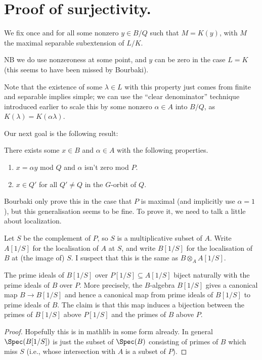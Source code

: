 \section{Proof of surjectivity.}

\begin{definition} We fix once and for all some nonzero $y\in B/Q$ such that $M=K(y)$,
  with $M$ the maximal separable subextension of $L/K$.
  \leanok
\end{definition}

NB we do use nonzeroness at some point, and $y$ can be zero in the case $L=K$
(this seems to have been missed by Bourbaki).

Note that the existence of some $\lambda\in L$ with this property just comes from finite
and separable implies simple; we can use the ``clear denominator'' technique introduced
earlier to scale this by some nonzero $\alpha\in A$ into $B/Q$, as
$K(\lambda)=K(\alpha\lambda)$.

Our next goal is the following result:
\begin{theorem}
  \leanok
  There exists some $x\in B$ and $\alpha\in A$ with the following
  properties.
  \begin{enumerate}
  \item $x=\alpha y$ mod $Q$ and $\alpha$ isn't zero mod $P$.
  \item $x\in Q'$ for all $Q'\not=Q$ in the $G$-orbit of $Q$.
  \end{enumerate}
\end{theorem}

Bourbaki only prove this in the case that $P$ is maximal (and implicitly use $\alpha=1$),
but this generalisation seems to be fine. To prove it, we need to talk a little about localization.

Let $S$ be the complement of $P$, so $S$ is a multiplicative subset of $A$.
Write $A[1/S]$ for the localisation of $A$ at $S$, and write $B[1/S]$
for the localisation of $B$ at (the image of) $S$. I suspect that this is the
same as $B\otimes_AA[1/S]$.

\begin{lemma}
  \leanok
  The prime ideals of $B[1/S]$ over $P[1/S] \subseteq A[1/S]$ biject naturally with
  the prime ideals of $B$ over $P$. More precisely, the $B$-algebra $B[1/S]$
  gives a canonical map $B\to B[1/S]$ and hence a canonical map from prime ideals
  of $B[1/S]$ to prime ideals of $B$. The claim is that this map induces
  a bijection between the primes of $B[1/S]$ above $P[1/S]$ and the primes
  of $B$ above $P$.
\end{lemma}
\begin{proof}
  \leanok
  Hopefully this is in mathlib in some form already. In general $\Spec(B[1/S])$ is just the subset of $\Spec(B)$
  consisting of primes of $B$ which miss $S$ (i.e., whose intersection with $A$ is a subset of $P$).
\end{proof}

